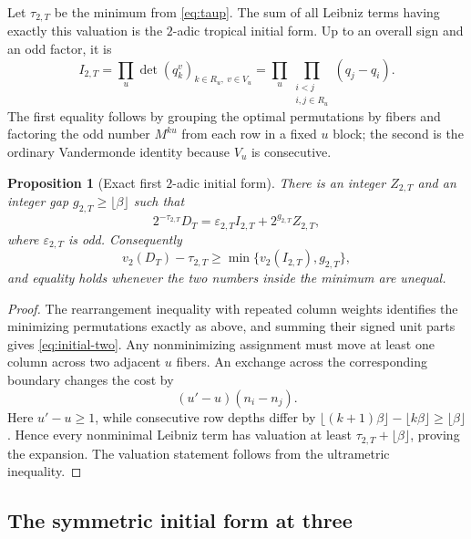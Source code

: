 \documentclass[11pt,oneside]{article}
\newtheorem{proposition}[theorem]{Proposition}
\theoremstyle{definition}
\theoremstyle{remark}
\begin{document}
Let $\tau_{2,T}$ be the minimum from \eqref{eq:taup}.  The sum of all Leibniz terms having
exactly this valuation is the $2$-adic tropical initial form.  Up to an overall sign and an odd
factor, it is
\begin{equation}\label{eq:initial-two}
 I_{2,T}
 =\prod_u
   \det\!\left(q_k^v\right)_{k\in R_u,\ v\in V_u}
 =\prod_u\prod_{\substack{i<j\\i,j\in R_u}}(q_j-q_i).
\end{equation}
The first equality follows by grouping the optimal permutations by fibers and factoring the
odd number $M^{ku}$ from each row in a fixed $u$ block; the second is the ordinary Vandermonde
identity because $V_u$ is consecutive.

\begin{proposition}[Exact first $2$-adic initial form]\label{prop:initial-two}
There is an integer $Z_{2,T}$ and an integer gap $g_{2,T}\ge\lfloor\beta\rfloor$ such that
\begin{equation}\label{eq:two-layer-expansion}
 2^{-\tau_{2,T}}D_T
 =\varepsilon_{2,T} I_{2,T}+2^{g_{2,T}}Z_{2,T},
\end{equation}
where $\varepsilon_{2,T}$ is odd.  Consequently
\begin{equation}\label{eq:two-layer-min}
 v_2(D_T)-\tau_{2,T}
 \ge \min\{v_2(I_{2,T}),g_{2,T}\},
\end{equation}
and equality holds whenever the two numbers inside the minimum are unequal.
\end{proposition}

\begin{proof}
The rearrangement inequality with repeated column weights identifies the minimizing
permutations exactly as above, and summing their signed unit parts gives
\eqref{eq:initial-two}.  Any nonminimizing assignment must move at least one column across two
adjacent $u$ fibers.  An exchange across the corresponding boundary changes the cost by
\[
 (u'-u)(n_i-n_j).
\]
Here $u'-u\ge1$, while consecutive row depths differ by
$\lfloor(k+1)\beta\rfloor-\lfloor k\beta\rfloor\ge\lfloor\beta\rfloor$.  Hence every
nonminimal Leibniz term has valuation at least $\tau_{2,T}+\lfloor\beta\rfloor$, proving the
expansion.  The valuation statement follows from the ultrametric inequality.
\end{proof}

\subsection{The symmetric initial form at three}
\end{document}
